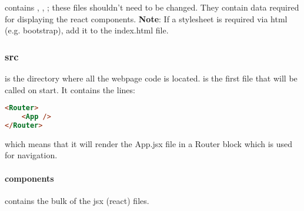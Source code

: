 \documentclass[12pt, titlepage, a4paper]{article}
\begin{document}
 contains , , ; these files shouldn't need to be changed. They contain data required for displaying the react components. \textbf{Note}: If a stylesheet is required via html (e.g. bootstrap), add it to the index.html file.  

\subsubsection{src}

 is the directory where all the webpage code is located.  is the first file that will be called on start. It contains the lines:

\begin{lstlisting}[language=HTML]
<Router>
    <App />
</Router>
\end{lstlisting}

which means that it will render the App.jsx file in a Router block which is used for navigation.\\

\paragraph{components}
 contains the bulk of the jsx (react) files.
\end{document}
